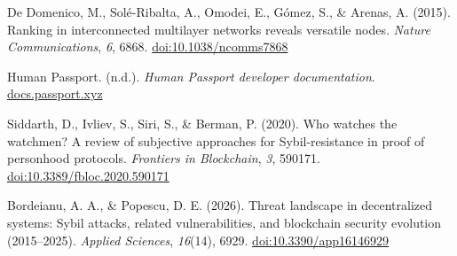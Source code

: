 \begin{enumerate}[label={[\arabic*]}, leftmargin=*, itemsep=0.35em, parsep=0pt]
  \item{}\label{ref:63} De Domenico, M., Sol\'{e}-Ribalta, A., Omodei, E., G\'{o}mez, S., \& Arenas, A. (2015). Ranking in interconnected multilayer networks reveals versatile nodes. \textit{Nature Communications}, \textit{6}, 6868. \href{https://doi.org/10.1038/ncomms7868}{doi:10.1038/ncomms7868}
  \item{}\label{ref:64} Human Passport. (n.d.). \textit{Human Passport developer documentation}. \href{https://docs.passport.xyz/}{docs.passport.xyz}
  \item{}\label{ref:65} Siddarth, D., Ivliev, S., Siri, S., \& Berman, P. (2020). Who watches the watchmen? A review of subjective approaches for Sybil-resistance in proof of personhood protocols. \textit{Frontiers in Blockchain}, \textit{3}, 590171. \href{https://doi.org/10.3389/fbloc.2020.590171}{doi:10.3389/fbloc.2020.590171}
  \item{}\label{ref:66} Bordeianu, A. A., \& Popescu, D. E. (2026). Threat landscape in decentralized systems: Sybil attacks, related vulnerabilities, and blockchain security evolution (2015--2025). \textit{Applied Sciences}, \textit{16}(14), 6929. \href{https://doi.org/10.3390/app16146929}{doi:10.3390/app16146929}
\end{enumerate}

